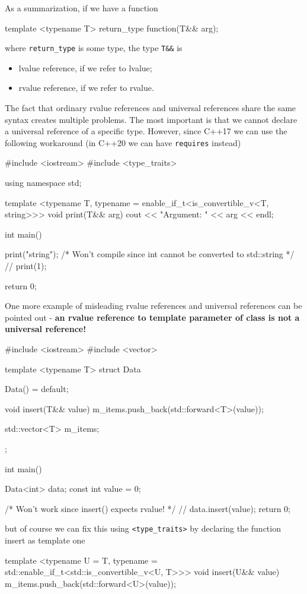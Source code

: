 \documentclass[../main]{subfiles}
\begin{document}
    As a summarization, if we have a function
\begin{Code}
    template <typename T>
    return_type function(T&& arg);
\end{Code}
where \texttt{return\_type} is some type, the type \texttt{T\&\&} is
\begin{itemize}
    \item lvalue reference, if we refer to lvalue;
    \item rvalue reference, if we refer to rvalue.
\end{itemize}

    The fact that ordinary rvalue references and universal references share the same syntax creates multiple problems.
The most important is that we cannot declare a universal reference of a specific type. However, since C++17 we can use the following workaround (in C++20 we can have \texttt{requires} instead)
\begin{Code}
    #include <iostream>
    #include <type_traits>
    
    using namespace std;
    
    template <typename T,
              typename = enable_if_t<is_convertible_v<T, string>>>
    void print(T&& arg)
    {
        cout << "Argument: " << arg << endl;
    }
    
    int main()
    {
        print("string");
        /* Won't compile since int cannot be converted to std::string */
        // print(1);
    
        return 0;
    } 
\end{Code}

    One more example of misleading rvalue references and universal references can be pointed out - \textbf{an rvalue reference to template parameter of class
is not a universal reference!}
\begin{Code}
    #include <iostream>
    #include <vector>
    
    template <typename T>
    struct Data
    {
        Data() = default;
        
        void insert(T&& value)
        {
            m_items.push_back(std::forward<T>(value));
        }
    
        std::vector<T> m_items;
    };
    
    int main()
    {
        Data<int> data;
        const int value = 0;
        
        /* Won't work since insert() expects rvalue! */
        // data.insert(value);
        return 0;
    } 
\end{Code}
but of course we can fix this using \texttt{<type\_traits>} by
declaring the function insert as template one
\begin{Code}
    template <typename U = T,
              typename = std::enable_if_t<std::is_convertible_v<U, T>>>
    void insert(U&& value)
    {
        m_items.push_back(std::forward<U>(value));
    }
\end{Code}
\end{document}
